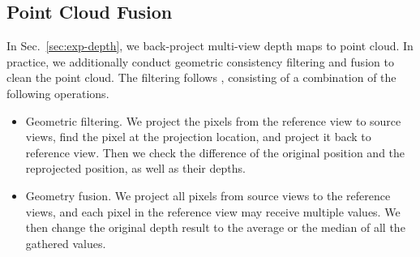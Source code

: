 \subsection{Point Cloud Fusion}
In Sec.~\ref{sec:exp-depth}, we back-project multi-view depth maps to point cloud. In practice, we additionally conduct geometric consistency filtering and fusion to clean the point cloud. The filtering follows \cite{yao2018mvsnet, zhang2023vis}, consisting of a combination of the following operations.
\begin{itemize}
    \item Geometric filtering. We project the pixels from the reference view to source views, find the pixel at the projection location, and project it back to reference view. Then we check the difference of the original position and the reprojected position, as well as their depths. 
    \item Geometry fusion. We project all pixels from source views to the reference views, and each pixel in the reference view may receive multiple values. We then change the original depth result to the average or the median of all the gathered values. 
\end{itemize}

\begin{table}[t]
    \centering
\caption{Unposed MVD evaluation on DTU, ETH3D, and T\&T.}
\label{tab:supp-multiview_depth}
\end{table}


